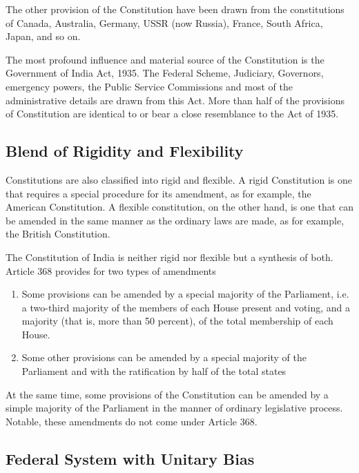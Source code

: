 The other provision of the Constitution have been drawn from the constitutions of Canada, Australia, Germany, USSR (now Russia), France, South Africa, Japan, and so on.

The most profound influence and material source of the Constitution is the Government of India Act, 1935. The Federal Scheme, Judiciary, Governors, emergency powers, the Public Service Commissions and most of the administrative details are drawn from this Act. More than half of the provisions of Constitution are identical to or bear a close resemblance to the Act of 1935.

\subsection{Blend of Rigidity and Flexibility}

Constitutions are also classified into rigid and flexible. A rigid Constitution is one that requires a special procedure for its amendment, as for example, the American Constitution. A flexible constitution, on the other hand, is one that can be amended in the same manner as the ordinary laws are made, as for example, the British Constitution.

The Constitution of India is neither rigid nor flexible but a synthesis of both. Article 368 provides for two types of amendments

\renewcommand{\labelenumi}{\textbf{(\alph{enumi})}}
\begin{enumerate}
  \item Some provisions can be amended by a special majority of the Parliament, i.e. a two-third majority of the members of each House present and voting, and a majority (that is, more than 50 percent), of the total membership of each House.
  \item Some other provisions can be amended by a special majority of the Parliament and with the ratification by half of the total states
\end{enumerate}

At the same time, some provisions of the Constitution can be amended by a simple majority of the Parliament in the manner of ordinary legislative process. Notable, these amendments do not come under Article 368.

\subsection{Federal System with Unitary Bias}

